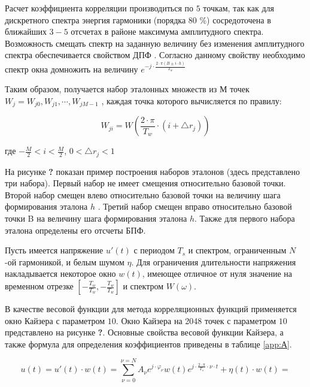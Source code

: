 Расчет коэффициента корреляции производиться по $5$ точкам, так как для дискретного спектра энергия гармоники (порядка $80$ \%) сосредоточена в ближайших $3-5$ отсчетах в районе максимума амплитудного спектра. Возможность смещать спектр на заданную величину без изменения амплитудного спектра обеспечивается свойством ДПФ \cite{sergienko2011digital}.
Согласно данному свойству необходимо спектр окна домножить на величину $e^{-j \cdot \frac{2 \cdot \pi (B \pm i \cdot h)}{T_w}}$

Таким образом, получается набор эталонных множеств из $М$  точек $W_j = {W_{j0}, W_{j1}, \cdots, W_{jM-1} }$ , каждая точка которого вычисляется по правилу:

\begin{equation}
	\label{eq:equation3.1}
W_{ji} = W \left( {\frac{2 \cdot \pi}{T_w} \cdot (i + \bigtriangleup r_j)}\right) 
\end{equation}

где $- \frac{M}{2} < i < \frac{M}{2}$, $0 < \bigtriangleup r_j < 1$

На рисунке \textbf{?} показан пример построения наборов эталонов (здесь представлено три набора). Первый набор не имеет смещения относительно базовой точки. Второй набор смещен влево относительно базовой точки на величину шага формирования эталона $h$  . Третий набор смещен вправо относительно базовой точки B на величину шага формирования эталона $h$. Также для первого набора эталона определены его отсчеты БПФ. 

Пусть имеется напряжение $u'(t)$ с периодом $T_s$ и спектром, ограниченным  $N$-ой гармоникой, и белым шумом $\eta$. Для ограничения длительности напряжения накладывается некоторое окно $w(t)$, имеющее отличное от нуля значение на временном отрезке $[- \frac{T_w}{T_w}, - \frac{T_w}{T_w}] $ и спектром $W(\omega)$. 

В качестве весовой функции для метода корреляционных функций применяется окно Кайзера с параметром $10$. Окно Кайзера на 2048 точек с параметром $10$ представлено на рисунке \textbf{?}. Основные свойства весовой функции Кайзера, а также формула для определения коэффициентов приведены в таблице \ref{app:А}.

\begin{equation}
	\label{eq:equation3.2}
	u(t) = u'(t) \cdot w(t) = \displaystyle\sum_{\nu=0}^{\nu=N} A_\nu e^{j \cdot \varphi_\nu} w(t) e^{j \cdot \frac{2 \cdot \pi}{T_s} \cdot \nu \cdot t} + \eta (t) \cdot w(t) = 
\end{equation}

